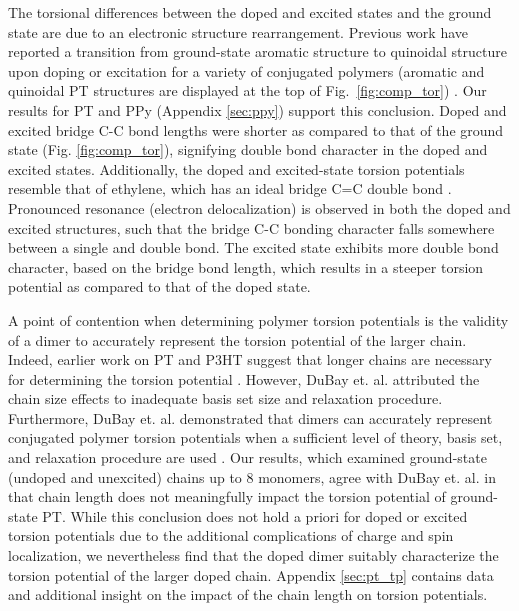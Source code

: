 The torsional differences between the doped and excited states and the ground state are due to an electronic structure rearrangement. Previous work have reported a transition from ground-state aromatic structure to quinoidal structure upon doping or excitation for a variety of conjugated polymers (aromatic and quinoidal PT structures are displayed at the top of Fig.~\ref{fig:comp_tor}) \cite{Roth2013_ch5, Burrezo2017, Wells2008, Aime1989, Banerji2011, Roseli2017, Busby2011, Yu2014, Fonner2010, Baitoul2000, Bradley1989}. Our results for PT and PPy (Appendix \ref{sec:ppy}) support this conclusion. Doped and excited bridge C-C bond lengths were shorter as compared to that of the ground state (Fig. \ref{fig:comp_tor}), signifying double bond character in the doped and excited states. Additionally, the doped and excited-state torsion potentials resemble that of ethylene, which has an ideal bridge C=C double bond \cite{Shao2003}. Pronounced resonance (electron delocalization) is observed in both the doped and excited structures, such that the bridge C-C bonding character falls somewhere between a single and double bond. The excited state exhibits more double bond character, based on the bridge bond length, which results in a steeper torsion potential as compared to that of the doped state.

A point of contention when determining polymer torsion potentials is the validity of a dimer to accurately represent the torsion potential of the larger chain. Indeed, earlier work on PT and P3HT suggest that longer chains are necessary for determining the torsion potential \cite{Darling2009}. However, DuBay et. al. attributed the chain size effects to inadequate basis set size and relaxation procedure. Furthermore, DuBay et. al. demonstrated that dimers can accurately represent conjugated polymer torsion potentials when a sufficient level of theory, basis set, and relaxation procedure are used \cite{Dubay2012}. Our results, which examined ground-state (undoped and unexcited) chains up to 8 monomers, agree with DuBay et. al. in that chain length does not meaningfully impact the torsion potential of ground-state PT. While this conclusion does not hold a priori for doped or excited torsion potentials due to the additional complications of charge and spin localization, we nevertheless find that the doped dimer suitably characterize the torsion potential of the larger doped chain. Appendix \ref{sec:pt_tp} contains data and additional insight on the impact of the chain length on torsion potentials.

